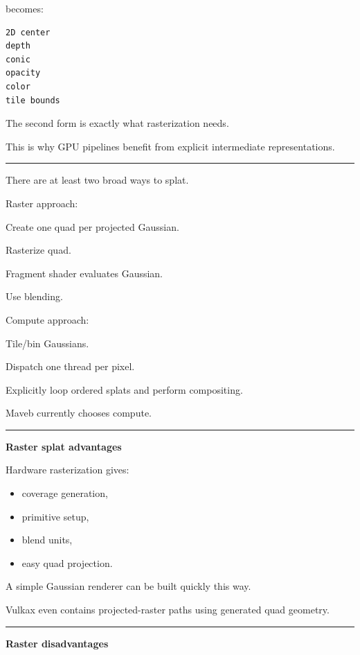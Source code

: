 becomes:

\protect{}\label{z54oi2}%
\begin{verbatim}
2D center
depth
conic
opacity
color
tile bounds
\end{verbatim}

The second form is exactly what rasterization needs.

This is why GPU pipelines benefit from explicit intermediate representations.

\begin{center}\rule{0.5\linewidth}{0.5pt}\end{center}

There are at least two broad ways to splat.

Raster approach:

Create one quad per projected Gaussian.

Rasterize quad.

Fragment shader evaluates Gaussian.

Use blending.

Compute approach:

Tile/bin Gaussians.

Dispatch one thread per pixel.

Explicitly loop ordered splats and perform compositing.

Maveb currently chooses compute.

\begin{center}\rule{0.5\linewidth}{0.5pt}\end{center}

\textbf{Raster splat advantages}

Hardware rasterization gives:

\begin{itemize}
\tightlist
\item
  coverage generation,
\item
  primitive setup,
\item
  blend units,
\item
  easy quad projection.
\end{itemize}

A simple Gaussian renderer can be built quickly this way.

Vulkax even contains projected-raster paths using generated quad geometry.

\begin{center}\rule{0.5\linewidth}{0.5pt}\end{center}

\textbf{Raster disadvantages}

